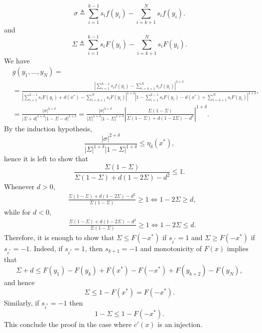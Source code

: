 \begin{proof-of-lemma}[\ref{lem:bound_intervals_delta}]
\begin{equation*}
  \end{equation*}
  \begin{equation*}
    \sigma \triangleq \sum_{i=1}^{k-1} s_i f(y_i) - \sum_{i=k+1}^{N} s_i f(y_i). 
  \end{equation*}
  and 
  \begin{equation*}
    \Sigma \triangleq \sum_{i=1}^{k-1} s_i F(y_i) - \sum_{i=k+1}^{N} s_i F(y_i). 
  \end{equation*}
  We have
  \begin{align*}
    & g(y_1,\ldots,y_N) =\nonumber  \\ 
    & =
    \frac{ \left| \sum_{i=1}^{k-1} s_i f(y_i) - \sum_{i=k+1}^{N} s_i f(y_i) \right|^{2+\delta}} 
         {\left| \sum_{i=1}^{k-1} s_i F(y_i) + d(x^*) - \sum_{i=k+1}^{N} s_i F(y_i) \right|^{1+\delta} \left|1- \sum_{i=1}^{k-1} s_i F(y_i) - d(x^*) + \sum_{i=k+1}^{N} s_i F(y_i)   \right|^{1+\delta} }, \\
         & = \frac{ \left| \sigma \right|^{2+\delta}} 
         {\left| \Sigma+d \right|^{1+\delta} \left|1- \Sigma - d \right|^{1+\delta} }  =  
         \frac{ \left| \sigma \right|^{2+\delta}} 
              {\left| \Sigma \right|^{1+\delta} \left|1- \Sigma \right|^{1+\delta} }  \left| \frac{\Sigma(1-\Sigma) } { \Sigma(1-\Sigma) + d(1-2\Sigma)-d^2} \right|^{1+\delta}. 
  \end{align*}
  By the induction hypothesis,
  \begin{equation*}
    \frac{ \left| \sigma \right|^{2+\delta}} 
         {\left| \Sigma \right|^{1+\delta} \left|1- \Sigma \right|^{1+\delta} } \leq \eta_\delta(x^*), 
  \end{equation*}
  hence it is left to show that 
  \begin{equation*}
    \frac{\Sigma(1-\Sigma) } { \Sigma(1-\Sigma) + d(1-2\Sigma)-d^2} \leq 1.
  \end{equation*}
  Whenever $d>0$, 
  \begin{align*}
    & \frac{ \Sigma(1-\Sigma) + d(1-2\Sigma)-d^2} {\Sigma(1-\Sigma)} \geq 1 \Leftrightarrow  1-2\Sigma \geq d, 
  \end{align*}
  while for $d<0$,
  \begin{align*}
    & \frac{ \Sigma(1-\Sigma) + d(1-2\Sigma)-d^2} {\Sigma(1-\Sigma)} \geq 1 \Leftrightarrow  1-2\Sigma \leq d. 
  \end{align*}
  Therefore, it is enough to show that $\Sigma \leq F(-x^*)$ if $s_{i^*}=1$ and 
  $\Sigma \geq F(-x^*)$ if $s_{i^*}=-1$. 
  Indeed, if $s_{i^*}=1$, then $s_{k+1}=-1$ and monotonicity of $F(x)$ implies that 
  \begin{equation*}
    \Sigma + d \leq F(y_1) - F(y_k) + F(x^*) - F(-x^*) + F(y_{k+2}) - F(y_N), 
  \end{equation*}
  and hence
  \begin{equation*}
    \Sigma \leq 1-F(x^*) = F(-x^*). 
  \end{equation*}
  Similarly, if $s_{i^*}=-1$ then 
  \begin{equation*}
    1 - \Sigma \leq 1 -  F(-x^*).
  \end{equation*}
  This conclude the proof in the case where $c'(x)$ is an injection. 


\end{proof-of-lemma}
